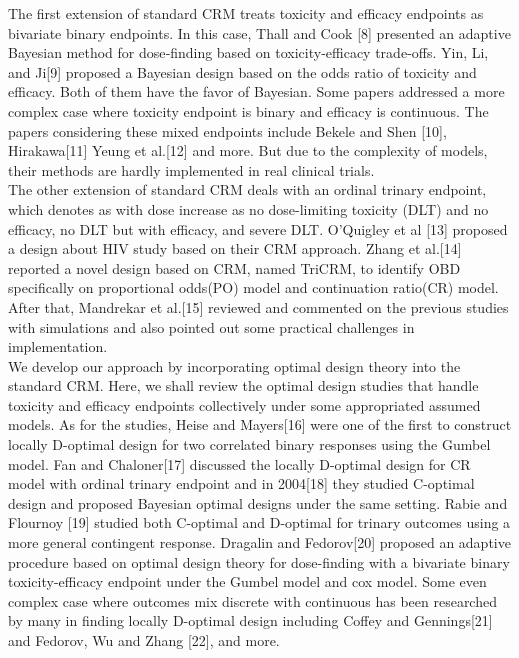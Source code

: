 \documentclass[12pt]{article}
\begin{document}
The first extension of standard CRM treats toxicity and efficacy endpoints as bivariate binary endpoints. In this case, Thall and Cook [8] presented an adaptive Bayesian method for dose‐finding based on toxicity-efficacy trade‐offs. Yin, Li, and Ji[9] proposed a Bayesian design based on the odds ratio of toxicity and efficacy. Both of them have the favor of Bayesian. Some papers addressed a more complex case where toxicity endpoint is binary and efficacy is continuous. The papers considering these mixed endpoints include Bekele and Shen [10], Hirakawa[11] Yeung et al.[12] and more. But due to the complexity of models, their methods are hardly implemented in real clinical trials.\\
The other extension of standard CRM deals with an ordinal trinary endpoint, which denotes as with dose increase as no dose-limiting toxicity (DLT) and no efficacy, no DLT but with efficacy, and severe DLT. O’Quigley et al [13] proposed a design about HIV study based on their CRM approach. Zhang et al.[14] reported a novel design based on CRM, named TriCRM, to identify OBD specifically on proportional odds(PO) model and continuation ratio(CR) model. After that, Mandrekar et al.[15] reviewed and commented on the previous studies with simulations and also pointed out some practical challenges in implementation.\\
We develop our approach by incorporating optimal design theory into the standard CRM. Here, we shall review the optimal design studies that handle toxicity and efficacy endpoints collectively under some appropriated assumed models. As for the studies, Heise and Mayers[16] were one of the first to construct locally D-optimal design for two correlated binary responses using the Gumbel model. Fan and Chaloner[17] discussed the locally D-optimal design for CR model with ordinal trinary endpoint and in 2004[18] they studied C-optimal design and proposed Bayesian optimal designs under the same setting. Rabie and Flournoy [19] studied both C-optimal and D-optimal for trinary outcomes using a more general contingent response. Dragalin and Fedorov[20] proposed an adaptive procedure based on optimal design theory for dose-finding with a bivariate binary toxicity-efficacy endpoint under the Gumbel model and cox model. Some even complex case where outcomes mix discrete with continuous has been researched by many in finding locally D-optimal design including Coffey and Gennings[21] and Fedorov, Wu and Zhang [22], and more.\\
\end{document}
